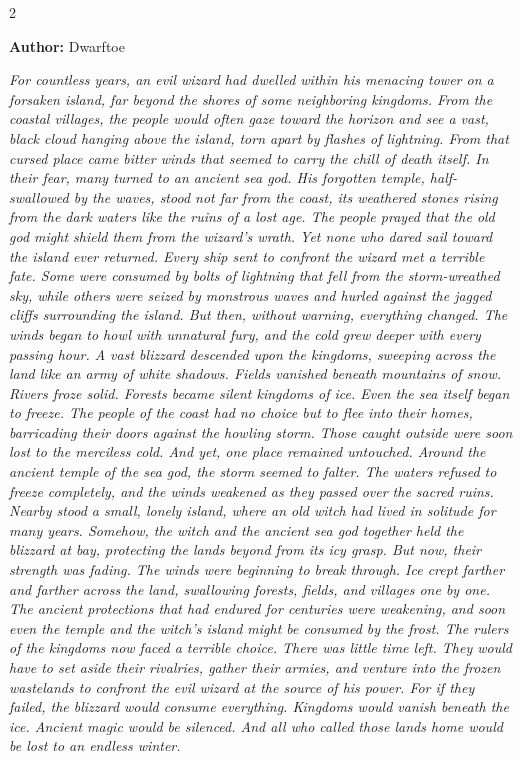
\begin{multicols*}{2}

\textbf{Author:} Dwarftoe

\textit{For countless years, an evil wizard had dwelled within his menacing tower on a forsaken island, far beyond the shores of some neighboring kingdoms. From the coastal villages, the people would often gaze toward the horizon and see a vast, black cloud hanging above the island, torn apart by flashes of lightning. From that cursed place came bitter winds that seemed to carry the chill of death itself. In their fear, many turned to an ancient sea god. His forgotten temple, half-swallowed by the waves, stood not far from the coast, its weathered stones rising from the dark waters like the ruins of a lost age. The people prayed that the old god might shield them from the wizard’s wrath. Yet none who dared sail toward the island ever returned. Every ship sent to confront the wizard met a terrible fate. Some were consumed by bolts of lightning that fell from the storm-wreathed sky, while others were seized by monstrous waves and hurled against the jagged cliffs surrounding the island. But then, without warning, everything changed. The winds began to howl with unnatural fury, and the cold grew deeper with every passing hour. A vast blizzard descended upon the kingdoms, sweeping across the land like an army of white shadows. Fields vanished beneath mountains of snow. Rivers froze solid. Forests became silent kingdoms of ice. Even the sea itself began to freeze. The people of the coast had no choice but to flee into their homes, barricading their doors against the howling storm. Those caught outside were soon lost to the merciless cold. And yet, one place remained untouched. Around the ancient temple of the sea god, the storm seemed to falter. The waters refused to freeze completely, and the winds weakened as they passed over the sacred ruins. Nearby stood a small, lonely island, where an old witch had lived in solitude for many years. Somehow, the witch and the ancient sea god together held the blizzard at bay, protecting the lands beyond from its icy grasp. But now, their strength was fading. The winds were beginning to break through. Ice crept farther and farther across the land, swallowing forests, fields, and villages one by one. The ancient protections that had endured for centuries were weakening, and soon even the temple and the witch's island might be consumed by the frost. The rulers of the kingdoms now faced a terrible choice. There was little time left. They would have to set aside their rivalries, gather their armies, and venture into the frozen wastelands to confront the evil wizard at the source of his power. For if they failed, the blizzard would consume everything. Kingdoms would vanish beneath the ice. Ancient magic would be silenced. And all who called those lands home would be lost to an endless winter.}


\end{multicols*}
